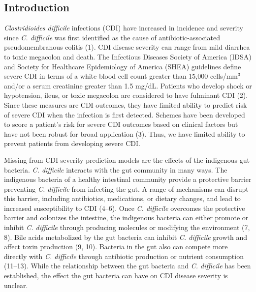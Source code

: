 \documentclass[
  12pt,
]{article}
\begin{document}
\newpage

\hypertarget{introduction}{%
\subsection{Introduction}\label{introduction}}

\emph{Clostridioides difficile} infections (CDI) have increased in
incidence and severity since \emph{C. difficile} was first identified as
the cause of antibiotic-associated pseudomembranous colitis (1). CDI
disease severity can range from mild diarrhea to toxic megacolon and
death. The Infectious Diseases Society of America (IDSA) and Society for
Healthcare Epidemiology of America (SHEA) guidelines define severe CDI
in terms of a white blood cell count greater than 15,000 cells/mm\(^3\)
and/or a serum creatinine greater than 1.5 mg/dL. Patients who develop
shock or hypotension, ileus, or toxic megacolon are considered to have
fulminant CDI (2). Since these measures are CDI outcomes, they have
limited ability to predict risk of severe CDI when the infection is
first detected. Schemes have been developed to score a patient's risk
for severe CDI outcomes based on clinical factors but have not been
robust for broad application (3). Thus, we have limited ability to
prevent patients from developing severe CDI.

Missing from CDI severity prediction models are the effects of the
indigenous gut bacteria. \emph{C. difficile} interacts with the gut
community in many ways. The indigenous bacteria of a healthy intestinal
community provide a protective barrier preventing \emph{C. difficile}
from infecting the gut. A range of mechanisms can disrupt this barrier,
including antibiotics, medications, or dietary changes, and lead to
increased susceptibility to CDI (4--6). Once \emph{C. difficile}
overcomes the protective barrier and colonizes the intestine, the
indigenous bacteria can either promote or inhibit \emph{C. difficile}
through producing molecules or modifying the environment (7, 8). Bile
acids metabolized by the gut bacteria can inhibit \emph{C. difficile}
growth and affect toxin production (9, 10). Bacteria in the gut also can
compete more directly with \emph{C. difficile} through antibiotic
production or nutrient consumption (11--13). While the relationship
between the gut bacteria and \emph{C. difficile} has been established,
the effect the gut bacteria can have on CDI disease severity is unclear.
\end{document}
